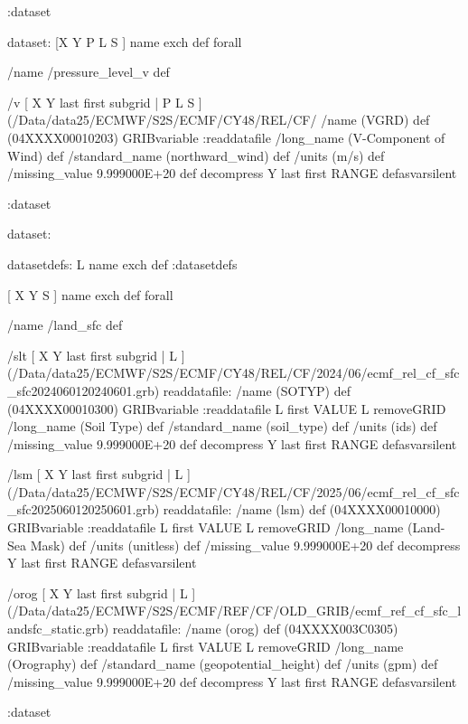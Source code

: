 \begin{ingrid}
:dataset

dataset:
[X Y P L S ] {name exch def } forall

/name /pressure_level_v def

/v { [ X Y last first subgrid | P L S ] (/Data/data25/ECMWF/S2S/ECMF/CY48/REL/CF/%
/name (VGRD) def
(04XXXX00010203) GRIBvariable
:readdatafile
/long_name (V-Component of Wind) def
/standard_name (northward_wind) def
/units (m/s) def
/missing_value 9.999000E+20 def
decompress
Y last first RANGE
} defasvarsilent

:dataset


\end{ingrid}

\begin{ingrid}
dataset:

datasetdefs:
L name exch def
:datasetdefs

[ X Y S ] {name exch def } forall

/name /land_sfc def

/slt { [ X Y last first subgrid | L ] (/Data/data25/ECMWF/S2S/ECMF/CY48/REL/CF/2024/06/ecmf_rel_cf_sfc_sfc2024060120240601.grb) readdatafile:
/name (SOTYP) def
(04XXXX00010300) GRIBvariable
:readdatafile
L first VALUE L removeGRID
/long_name (Soil Type) def
/standard_name (soil_type) def
/units (ids) def
/missing_value 9.999000E+20 def
decompress
Y last first RANGE
} defasvarsilent

/lsm { [ X Y last first subgrid | L ] (/Data/data25/ECMWF/S2S/ECMF/CY48/REL/CF/2025/06/ecmf_rel_cf_sfc_sfc2025060120250601.grb) readdatafile:
/name (lsm) def
(04XXXX00010000) GRIBvariable
:readdatafile
L first VALUE L removeGRID
/long_name (Land-Sea Mask) def
/units (unitless) def
/missing_value 9.999000E+20 def
decompress
Y last first RANGE
} defasvarsilent

/orog { [ X Y last first subgrid | L ] (/Data/data25/ECMWF/S2S/ECMF/REF/CF/OLD_GRIB/ecmf_ref_cf_sfc_landsfc_static.grb) readdatafile:
/name (orog) def
(04XXXX003C0305) GRIBvariable
:readdatafile
L first VALUE L removeGRID
/long_name (Orography) def
/standard_name (geopotential_height) def
/units (gpm) def
/missing_value 9.999000E+20 def
decompress
Y last first RANGE
} defasvarsilent

:dataset

\end{ingrid}

